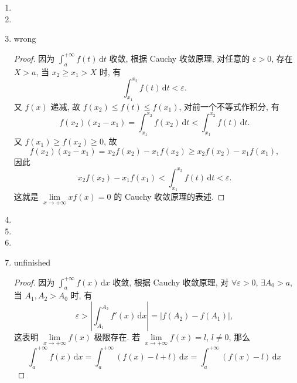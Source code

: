 \documentclass[a4paper, 11pt]{ctexart}
\begin{document}
\begin{enumerate}
    \item %
    \item %
    \item %
        
        {\color{red}wrong}
    \begin{proof}
            因为 $\displaystyle{\int_a^{+\infty}f(t)\,\mathrm{d}t}$ 收敛, 根据 Cauchy 收敛原理, 对任意的 $\varepsilon > 0$, 存在 $X > a$, 当 $x_2 \geq x_1 > X$ 时, 有
            \[
                \int_{x_1}^{x_2}f(t)\,\mathrm{d}t < \varepsilon.    
            \]
            又 $f(x)$ 递减, 故 $f(x_2) \leq f(t) \leq f(x_1)$, 对前一个不等式作积分, 有
            \[
                f(x_2)(x_2 - x_1) = \int_{x_1}^{x_2}f(x_2)\,\mathrm{d}t < \int_{x_1}^{x_2}f(t)\,\mathrm{d}t.
            \]
            又 $f(x_1) \geq f(x_2) \geq 0$, 故
            \[
                f(x_2)(x_2 - x_1) = x_2f(x_2) - x_1f(x_2) \geq x_2f(x_2) - x_1f(x_1),  
            \] 
            因此
            \[
                x_2f(x_2) - x_1f(x_1) < \int_{x_1}^{x_2}f(t)\,\mathrm{d}t < \varepsilon.   
            \]
            这就是 $\lim\limits_{x\to+\infty}xf(x) = 0$ 的 Cauchy 收敛原理的表述.
        \end{proof}
    \item %
    \item %
    \item %
    \item %
        {\color{red}unfinished}
        \begin{proof}
            因为 $\displaystyle{\int_a^{+\infty}f(x)\,\mathrm{d}x}$ 收敛, 根据 Cauchy 收敛原理, 对 $\forall \varepsilon > 0$, $\exists A_0 > a$,
            当 $A_1, A_2 > A_0$ 时, 有
            \[
                \varepsilon > \left|\int_{A_1}^{A_2}f'(x)\,\mathrm{d}x\right| = |f(A_2) - f(A_1)|,   
            \]
            这表明 $\lim\limits_{x\to+\infty}f(x)$ 极限存在. 若 $\lim\limits_{x\to+\infty}f(x)=l$, $l \neq 0$, 那么
            \[
                \int_{a}^{+\infty}f(x)\,\mathrm{d}x = \int_{a}^{+\infty}(f(x)-l+l)\,\mathrm{d}x = \int_{a}^{+\infty}(f(x)-l)\,\mathrm{d}x   
            \]
        \end{proof}
\end{enumerate}
\end{document}
